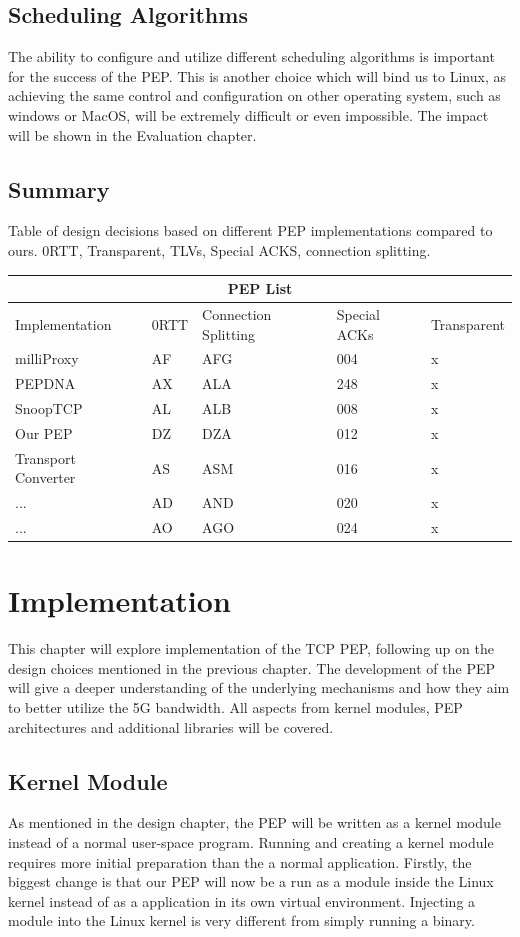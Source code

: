 \documentclass[a4paper,english, 11pt]{report}
\begin{document}
\section{Scheduling Algorithms}
The ability to configure and utilize different scheduling algorithms is important for the success of the PEP. This is another choice which will bind us to Linux, as achieving the same control and configuration on other operating system, such as windows or MacOS, will be extremely difficult or even impossible. The impact will be shown in the Evaluation chapter.

\section{Summary}

{Table of design decisions based on different PEP implementations compared to ours.}
{0RTT, Transparent, TLVs, Special ACKS, connection splitting.}\\
\begin{tabular}{ |p{4cm}||p{2cm}|p{2cm}|p{2cm}|p{2cm}| }
 \hline
 \multicolumn{5}{|c|}{PEP List} \\
 \hline
 Implementation& 0RTT &Connection Splitting &Special ACKs &Transparent\\
 \hline
 milliProxy   & AF    &AFG&   004 & x\\
 PEPDNA&   AX  & ALA   &248 & x\\
 SnoopTCP &AL & ALB&  008 & x\\
 Our PEP    &DZ & DZA&  012& x \\
 Transport Converter &   AS  & ASM&016& x\\
 ...& AD  & AND   &020& x\\
 ...& AO  & AGO&024& x\\
 \hline
\end{tabular}

\chapter{Implementation}
This chapter will explore implementation of the TCP PEP, following up on the design choices mentioned in the previous chapter. The development of the PEP will give a deeper understanding of the underlying mechanisms and how they aim to better utilize the 5G bandwidth. All aspects from kernel modules, PEP architectures and additional libraries will be covered.

\section{Kernel Module}
As mentioned in the design chapter, the PEP will be written as a kernel module instead of a normal user-space program. Running and creating a kernel module requires more initial preparation than the a normal application. Firstly, the biggest change is that our PEP will now be a run as a module inside the Linux kernel instead of as a application in its own virtual environment. Injecting a module into the Linux kernel is very different from simply running a binary.\\
\end{document}
